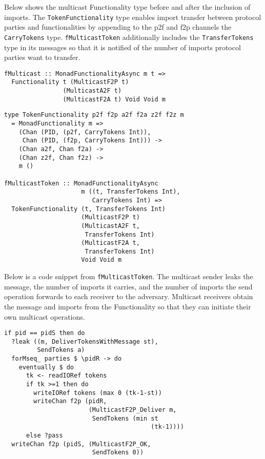 Below shows the multicast Functionality type before and after the inclusion of imports. The \texttt{TokenFunctionality} type enables import transfer between protocol parties and functionalities by appending to the p2f and f2p channels the \texttt{CarryTokens} type. \texttt{fMulticastToken} additionally includes the \texttt{TransferTokens} type in its messages so that it is notified of the number of imports protocol parties want to transfer.

\begin{lstlisting}
fMulticast :: MonadFunctionalityAsync m t => 
  Functionality t (MulticastF2P t) 
                (MulticastA2F t) 
                (MulticastF2A t) Void Void m
\end{lstlisting}

\begin{lstlisting}
type TokenFunctionality p2f f2p a2f f2a z2f f2z m 
  = MonadFunctionality m => 
    (Chan (PID, (p2f, CarryTokens Int)), 
     Chan (PID, (f2p, CarryTokens Int))) -> 
    (Chan a2f, Chan f2a) -> 
    (Chan z2f, Chan f2z) -> 
    m ()

fMulticastToken :: MonadFunctionalityAsync 
                     m ((t, TransferTokens Int), 
                        CarryTokens Int) => 
  TokenFunctionality (t, TransferTokens Int) 
                     (MulticastF2P t) 
                     (MulticastA2F t, 
                      TransferTokens Int) 
                     (MulticastF2A t, 
                      TransferTokens Int) 
                     Void Void m
\end{lstlisting}

Below is a code snippet from \texttt{fMulticastToken}. The multicast sender leaks the message, the number of imports it carries, and the number of imports the send operation forwards to each receiver to the adversary. Multicast receivers obtain the message and imports from the Functionality so that they can initiate their own multicast operations.

\begin{lstlisting}
if pid == pidS then do
  ?leak ((m, DeliverTokensWithMessage st), 
         SendTokens a)
  forMseq_ parties $ \pidR -> do
    eventually $ do
      tk <- readIORef tokens
      if tk >=1 then do
        writeIORef tokens (max 0 (tk-1-st))
        writeChan f2p (pidR, 
                       (MulticastF2P_Deliver m, 
                        SendTokens (min st 
                                        (tk-1))))
      else ?pass
  writeChan f2p (pidS, (MulticastF2P_OK, 
                        SendTokens 0))
\end{lstlisting}

